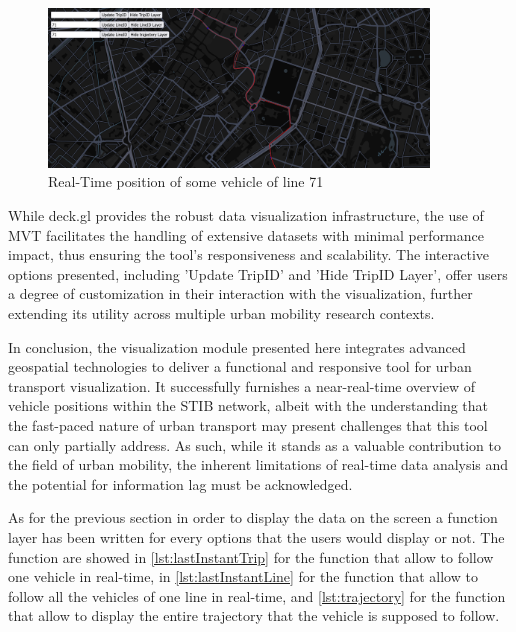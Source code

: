 \documentclass[12pt]{report}
\begin{document}
	\begin{center}
		\begin{figure}
			\centering
			\includegraphics[width=0.9\textwidth]{images/RTVisu.png}
			\caption{Real-Time position of some vehicle of line 71}
			\label{RTVisu}
		\end{figure}
	\end{center}
	
	While deck.gl provides the robust data visualization infrastructure, the use of MVT facilitates the handling of extensive datasets with minimal performance impact, thus ensuring the tool's responsiveness and scalability. The interactive options presented, including 'Update TripID' and 'Hide TripID Layer', offer users a degree of customization in their interaction with the visualization, further extending its utility across multiple urban mobility research contexts.
	
	In conclusion, the visualization module presented here integrates advanced geospatial technologies to deliver a functional and responsive tool for urban transport visualization. It successfully furnishes a near-real-time overview of vehicle positions within the STIB network, albeit with the understanding that the fast-paced nature of urban transport may present challenges that this tool can only partially address. As such, while it stands as a valuable contribution to the field of urban mobility, the inherent limitations of real-time data analysis and the potential for information lag must be acknowledged. 
	
	As for the previous section in order to display the data on the screen a function layer has been written for every options that the users would display or not. The function are showed in \ref{lst:lastInstantTrip} for the function that allow to follow one vehicle in real-time, in \ref{lst:lastInstantLine} for the function that allow to follow all the vehicles of one line in real-time, and \ref{lst:trajectory} for the function that allow to display the entire trajectory that the vehicle is supposed to follow.
	
\end{document}
